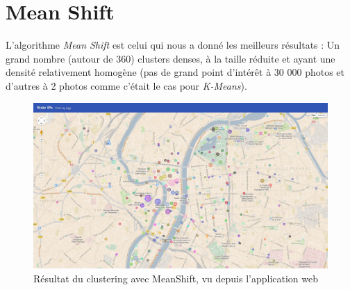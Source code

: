 \section{Mean Shift}
    L'algorithme \textit{Mean Shift} est celui qui nous a donné les meilleurs résultats : Un grand nombre (autour de 360) clusters denses,
    à la taille réduite et ayant une densité relativement homogène (pas de grand point d’intérêt à 30 000 photos et d'autres à 2 photos
    comme c'était le cas pour \textit{K-Means}).

    \begin{figure}[H]
        \centering
        \includegraphics[scale=0.3]{../screenshots/ui-global.png}
        \caption{Résultat du clustering avec MeanShift, vu depuis l'application web}
        \label{diagram:ui-global-clustering}
    \end{figure}
